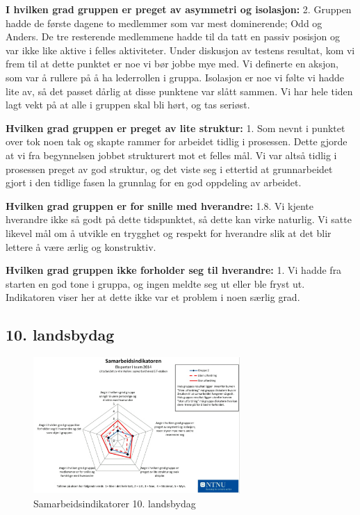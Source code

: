\noindent \textbf{I hvilken grad gruppen er preget av asymmetri og isolasjon:} 2.
\newline
\noindent Gruppen hadde de første dagene to medlemmer som var mest dominerende; Odd og Anders.
De tre resterende medlemmene hadde til da tatt en passiv posisjon og var ikke like aktive i felles aktiviteter. 
Under diskusjon av testens resultat, kom vi frem til at dette punktet er noe vi bør jobbe mye med. Vi definerte en aksjon, som var å rullere på å ha lederrollen i gruppa. 
Isolasjon er noe vi følte vi hadde lite av, så det passet dårlig at disse punktene var slått sammen. Vi har hele tiden lagt vekt på at alle i gruppen skal bli hørt, og tas seriøst. 

\vspace{\secspace}

\noindent \textbf{Hvilken grad gruppen er preget av lite struktur:} 1.
\newline
\noindent Som nevnt i punktet over tok noen tak og skapte rammer for arbeidet tidlig i prosessen. Dette gjorde at vi fra begynnelsen jobbet strukturert mot et felles mål. Vi var altså tidlig i prosessen preget av god struktur, og det viste seg i ettertid at grunnarbeidet gjort i den tidlige fasen la grunnlag for en god oppdeling av arbeidet. 
\vspace{\secspace}

\noindent \textbf{Hvilken grad gruppen er for snille med hverandre:} 1.8.
\newline
\noindent Vi kjente hverandre ikke så godt på dette tidspunktet, så dette kan virke naturlig. Vi satte likevel mål om å utvikle en trygghet og respekt for hverandre slik at det blir lettere å være ærlig og konstruktiv.
\vspace{\secspace}

\noindent \textbf{Hvilken grad gruppen ikke forholder seg til hverandre:} 1.
\newline
\noindent Vi hadde fra starten en god tone i gruppa, og ingen meldte seg ut eller ble fryst ut. Indikatoren viser her at dette ikke var et problem i noen særlig grad.

\subsection{10. landsbydag}
\begin{figure}[H]
    \centering
    \includegraphics[width=0.7\textwidth]{images/sam2.png} 
    \caption{Samarbeidsindikatorer 10. landsbydag}
    \label{fig:sam2}
\end{figure}

